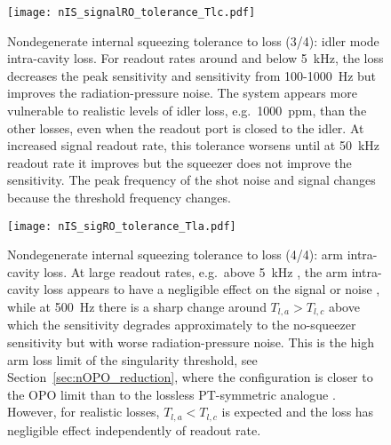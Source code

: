 \begin{figure}
    \centering
    \texttt{[image: nIS\_signalRO\_tolerance\_Tlc.pdf]}
    \caption{ Nondegenerate internal squeezing tolerance to loss (3/4): idler mode intra-cavity loss. For readout rates around and below 5~kHz, the loss decreases the peak sensitivity and sensitivity from 100-1000~Hz but improves the radiation-pressure noise. The system appears more vulnerable to realistic levels of idler loss, e.g.\ 1000~ppm, than the other losses, even when the readout port is closed to the idler. At increased signal readout rate, this tolerance worsens until at 50~kHz readout rate it improves  but the squeezer does not improve the sensitivity. The peak frequency of the shot noise and signal changes because the threshold frequency changes.}
    \label{fig:nIS_sigRO_tolerance_Tlc}
\end{figure}
\begin{figure}
    \centering
    \texttt{[image: nIS\_sigRO\_tolerance\_Tla.pdf]}
    \caption{ Nondegenerate internal squeezing tolerance to loss (4/4): arm intra-cavity loss. At large readout rates, e.g.\ above 5~kHz , the arm intra-cavity loss appears to have a negligible effect on the signal or noise , while at 500~Hz there is a sharp change around $T_{l,a}>T_{l,c}$  above which the sensitivity degrades approximately to the no-squeezer sensitivity  but with worse radiation-pressure noise. This is the high arm loss limit of the singularity threshold, see Section~\ref{sec:nOPO_reduction}, where the configuration is closer to the OPO limit than to the lossless PT-symmetric analogue . However, for realistic losses, $T_{l,a}<T_{l,c}$ is expected and the loss has negligible effect  independently of readout rate.}
    \label{fig:nIS_sigRO_tolerance_Tla}
\end{figure}

